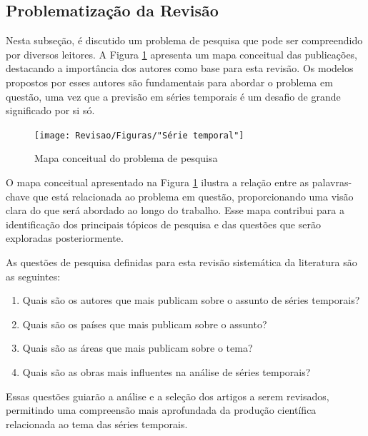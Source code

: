 \subsection{Problematiza\c c\~ao da Revis\~ao} \label{subsec: problematização da revisão}

Nesta subseção, é discutido um problema de pesquisa que pode ser compreendido por diversos leitores. A Figura \ref{fig:serie-temporal} apresenta um mapa conceitual das publicações, destacando a importância dos autores como base para esta revisão. Os modelos propostos por esses autores são fundamentais para abordar o problema em questão, uma vez que a previsão em séries temporais é um desafio de grande significado por si só.

\begin{figure}[H]
	\centering
	\caption{Mapa conceitual do problema de pesquisa}
	\label{fig:serie-temporal}
	\texttt{[image: Revisao/Figuras/"Série temporal"]}
	
\end{figure}

O mapa conceitual apresentado na Figura \ref{fig:serie-temporal} ilustra a relação entre as palavras-chave que está relacionada ao problema em questão, proporcionando uma visão clara do que será abordado ao longo do trabalho. Esse mapa contribui para a identificação dos principais tópicos de pesquisa e das questões que serão exploradas posteriormente.

As questões de pesquisa definidas para esta revisão sistemática da literatura são as seguintes:

\begin{enumerate}[start=1, label = {\textbf{Q} \arabic*} ]
	\item \label{questão:rev1} Quais são os autores que mais publicam sobre o assunto de séries temporais?
	\item \label{questão:rev2} Quais são os países que mais publicam sobre o assunto? 
	\item \label{questão:rev3} Quais são as áreas que mais publicam sobre o tema?
	\item \label{questão:rev4} Quais são as obras mais influentes na análise de séries temporais?
\end{enumerate}

Essas questões guiarão a análise e a seleção dos artigos a serem revisados, permitindo uma compreensão mais aprofundada da produção científica relacionada ao tema das séries temporais.


